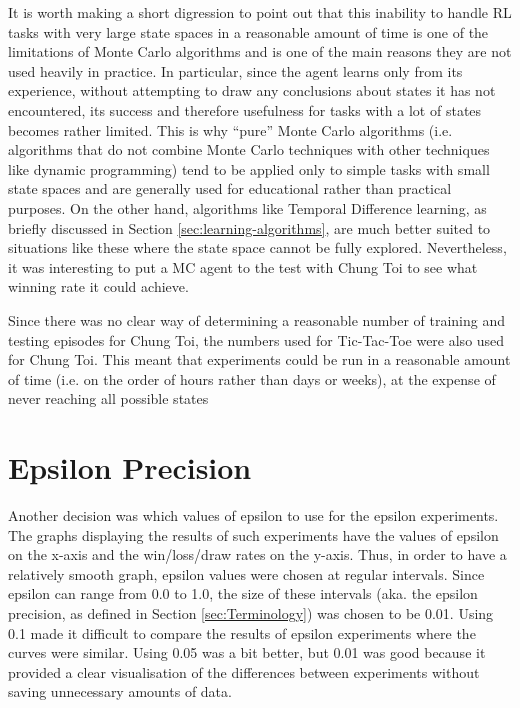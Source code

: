 \documentclass[11pt,a4paper,twoside,openright]{report}
\begin{document}
It is worth making a short digression to point out that this inability to handle RL tasks with very large state spaces in a reasonable amount of time is one of the limitations of Monte Carlo algorithms and is one of the main reasons they are not used heavily in practice. In particular, since the agent learns only from its experience, without attempting to draw any conclusions about states it has not encountered, its success and therefore usefulness for tasks with a lot of states becomes rather limited. This is why ``pure'' Monte Carlo algorithms (i.e. algorithms that do not combine Monte Carlo techniques with other techniques like dynamic programming) tend to be applied only to simple tasks with small state spaces and are generally used for educational rather than practical purposes. On the other hand, algorithms like Temporal Difference learning, as briefly discussed in Section \ref{sec:learning-algorithms}, are much better suited to situations like these where the state space cannot be fully explored. Nevertheless, it was interesting to put a MC agent to the test with Chung Toi to see what winning rate it could achieve.

Since there was no clear way of determining a reasonable number of training and testing episodes for Chung Toi, the numbers used for Tic-Tac-Toe were also used for Chung Toi. This meant that experiments could be run in a reasonable amount of time (i.e. on the order of hours rather than days or weeks), at the expense of never reaching all possible states


\section{Epsilon Precision}
\label{sec:epsilon-precision}

Another decision was which values of epsilon to use for the epsilon experiments. The graphs displaying the results of such experiments have the values of epsilon on the x-axis and the win/loss/draw rates on the y-axis. Thus, in order to have a relatively smooth graph, epsilon values were chosen at regular intervals. Since epsilon can range from 0.0 to 1.0, the size of these intervals (aka. the epsilon precision, as defined in Section \ref{sec:Terminology}) was chosen to be 0.01. Using 0.1 made it difficult to compare the results of epsilon experiments where the curves were similar. Using 0.05 was a bit better, but 0.01 was good because it provided a clear visualisation of the differences between experiments without saving unnecessary amounts of data.
\end{document}
